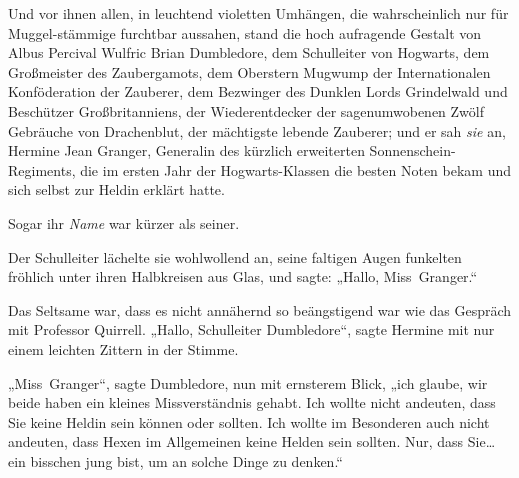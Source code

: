Und vor ihnen allen, in leuchtend violetten Umhängen, die wahrscheinlich nur für Muggel-stämmige furchtbar aussahen, stand die hoch aufragende Gestalt von Albus Percival Wulfric Brian Dumbledore, dem Schulleiter von Hogwarts, dem Großmeister des Zaubergamots, dem Oberstern Mugwump der Internationalen Konföderation der Zauberer, dem Bezwinger des Dunklen Lords Grindelwald und Beschützer Großbritanniens, der Wiederentdecker der sagenumwobenen Zwölf Gebräuche von Drachenblut, der mächtigste lebende Zauberer; und er sah \emph{sie} an, Hermine Jean Granger, Generalin des kürzlich erweiterten Sonnenschein-Regiments, die im ersten Jahr der Hogwarts-Klassen die besten Noten bekam und sich selbst zur Heldin erklärt hatte.

Sogar ihr \emph{Name} war kürzer als seiner.

Der Schulleiter lächelte sie wohlwollend an, seine faltigen Augen funkelten fröhlich unter ihren Halbkreisen aus Glas, und sagte: „Hallo, Miss~Granger.“

Das Seltsame war, dass es nicht annähernd so beängstigend war wie das Gespräch mit Professor Quirrell. „Hallo, Schulleiter Dumbledore“, sagte Hermine mit nur einem leichten Zittern in der Stimme.

„Miss~Granger“, sagte Dumbledore, nun mit ernsterem Blick, „ich glaube, wir beide haben ein kleines Missverständnis gehabt. Ich wollte nicht andeuten, dass Sie keine Heldin sein können oder sollten. Ich wollte im Besonderen auch nicht andeuten, dass Hexen im Allgemeinen keine Helden sein sollten. Nur, dass Sie…ein bisschen jung bist, um an solche Dinge zu denken.“

